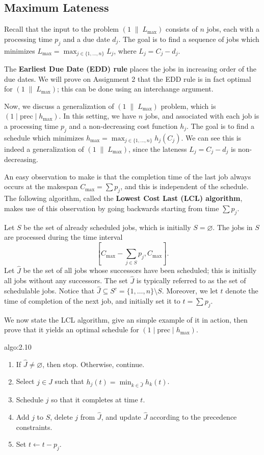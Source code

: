 \subsection{Maximum Lateness}\label{subsec:2.3}
Recall that the input to the problem $(1\;\|\;L_{\max})$ consists of 
$n$ jobs, each with a processing time $p_j$ and a due date $d_j$. 
The goal is to find a sequence of jobs which minimizes $L_{\max} = 
\max_{j\in\{1,\dots,n\}} L_j$, where $L_j = C_j - d_j$. 

The {\bf Earliest Due Date (EDD) rule} places the jobs in increasing order 
of the due dates. We will prove on Assignment 2 that the EDD rule is in fact 
optimal for $(1\;\|\;L_{\max})$; this can be done using an interchange argument.

Now, we discuss a generalization of $(1\;\|\;L_{\max})$ problem, which is 
$(1 \mid \text{prec} \mid h_{\max})$. In this setting, we have $n$ jobs, and 
associated with each job is a processing time $p_j$ and a non-decreasing 
cost function $h_j$. The goal is to find a schedule which minimizes 
$h_{\max} = \max_{j\in\{1,\dots,n\}} h_j(C_j)$. We can see this is indeed a 
generalization of $(1\;\|\;L_{\max})$, since the lateness $L_j = C_j - d_j$ 
is non-decreasing. 

An easy observation to make is that the completion time of the last job 
always occurs at the makespan $C_{\max} = \sum p_j$, and this is independent 
of the schedule. The following algorithm, called the {\bf Lowest Cost Last (LCL) algorithm}, makes 
use of this observation by going backwards starting from time $\sum p_j$. 

Let $S$ be the set of already scheduled jobs, which is initially $S = \varnothing$. 
The jobs in $S$ are processed during the time interval 
\[ \left[ C_{\max} - \sum_{j\in S} p_j, C_{\max} \right]. \] 
Let $\hat J$ be the set of all jobs whose successors have been 
scheduled; this is initially all jobs without any successors. 
The set $\hat J$ is typically referred to as the set of schedulable jobs.
Notice that $\hat J \subseteq S^c = \{1, \dots, n\} \setminus S$. Moreover, 
we let $t$ denote the time of completion of the next job, and initially 
set it to $t = \sum p_j$. 

We now state the LCL algorithm, give an simple example of it in action, then 
prove that it yields an optimal schedule for $(1 \mid \text{prec} \mid h_{\max})$. 

\begin{algo}{algo:2.10}
    \begin{enumerate}
        \item If $\hat J \neq \varnothing$, then stop. Otherwise, continue. 
        \item Select $j \in \hat J$ such that $h_j(t) = \min_{k\in\hat J} 
        h_k(t)$. 
        \item Schedule $j$ so that it completes at time $t$. 
        \item Add $j$ to $S$, delete $j$ from $\hat J$, and update $\hat J$
        according to the precedence constraints. 
        \item Set $t \gets t - p_j$. 
    \end{enumerate}
\end{algo} 

